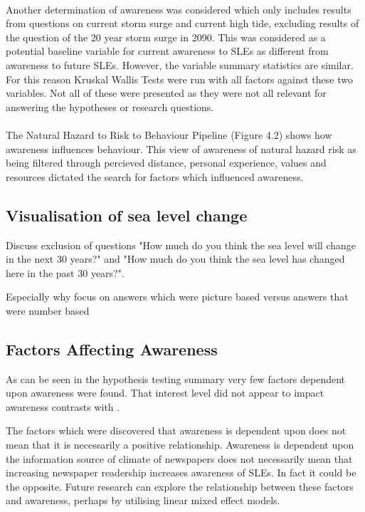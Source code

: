 \paragraph{}
Another determination of awareness was considered which only includes results from questions on current storm surge and current high tide, excluding results of the question of the 20 year storm surge in 2090. This was considered as a potential baseline variable for current awareness to SLEs as different from awareness to future SLEs. However, the variable summary statistics are similar. For this reason Kruskal Wallis Tests were run with all factors against these two variables. Not all of these were presented as they were not all relevant for answering the hypotheses or research questions. 

\paragraph{}
The Natural Hazard to Risk to Behaviour Pipeline (Figure 4.2) shows how awareness influences behaviour. This view of awareness of natural hazard risk as being filtered through percieved distance, personal experience, values and resources dictated the search for factors which influenced awareness. 


\subsection{Visualisation of sea level change}
Discuss exclusion of questions "How much do you think the sea level will change in the next 30 years?" and "How much do you think the sea level has changed here in the past 30 years?". 

Especially why focus on answers which were picture based versus answers that were number based



\subsection{Factors Affecting Awareness}
As can be seen in the hypothesis testing summary very few factors dependent upon awareness were found. That interest level did not appear to impact awareness contrasts with \cite{lujala_role_2020}. 


The factors which were discovered that awareness is dependent upon does not mean that it is necessarily a positive relationship. Awareness is dependent upon the information source of climate of newspapers does not necessarily mean that increasing newspaper readership increases awareness of SLEs. In fact it could be the opposite. Future research can explore the relationship between these factors and awareness, perhaps by utilising linear mixed effect models.

